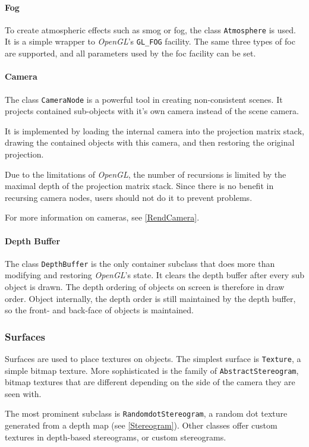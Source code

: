 \paragraph{Fog}
To create atmospheric effects such as smog or fog, the class \lstinline{Atmosphere} is used.
It is a simple wrapper to \textit{OpenGL}'s \lstinline{GL_FOG} facility.
The same three types of foc are supported, and all parameters used by the foc facility can be set.

\paragraph{Camera}
The class \lstinline{CameraNode} is a powerful tool in creating non-consistent scenes.
It projects contained sub-objects with it's own camera instead of the scene camera.

It is implemented by loading the internal camera into the projection matrix stack, drawing the contained objects with this camera, and then restoring the original projection.

Due to the limitations of \textit{OpenGL}, the number of recursions is limited by the maximal depth of the projection matrix stack.
Since there is no benefit in recursing camera nodes, users should not do it to prevent problems.

For more information on cameras, see \ref{RendCamera}.

\paragraph{Depth Buffer}
The class \lstinline{DepthBuffer} is the only container subclass that does more than modifying and restoring \textit{OpenGL}'s state.
It clears the depth buffer after every sub object is drawn.
The depth ordering of objects on screen is therefore in draw order.
Object internally, the depth order is still maintained by the depth buffer, so the front- and back-face of objects is maintained.


\subsubsection{Surfaces}
Surfaces are used to place textures on objects.
The simplest surface is \lstinline{Texture}, a simple bitmap texture.
More sophisticated is the family of \lstinline{AbstractStereogram}, bitmap textures that are different depending on the side of the camera they are seen with.

The most prominent subclass is \lstinline{RandomdotStereogram}, a random dot texture generated from a depth map (see \ref{Stereogram}).
Other classes offer custom textures in depth-based stereograms, or custom stereograms.

